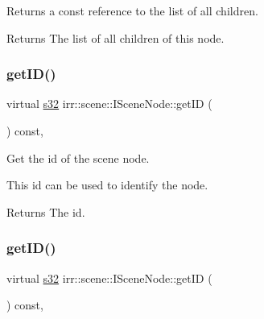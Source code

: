 Returns a const reference to the list of all children. 

\begin{DoxyReturn}{Returns}
The list of all children of this node. 
\end{DoxyReturn}
\mbox{\label{classirr_1_1scene_1_1ISceneNode_a1a3b5b32f54bc1b6617756fc48a2cb17}} 
\subsubsection{\texorpdfstring{get\+I\+D()}{getID()}\hspace{0.1cm}{\footnotesize\ttfamily [1/2]}}
{\footnotesize\ttfamily virtual \hyperlink{namespaceirr_ac66849b7a6ed16e30ebede579f9b47c6}{s32} irr\+::scene\+::\+I\+Scene\+Node\+::get\+ID (\begin{DoxyParamCaption}{ }\end{DoxyParamCaption}) const\hspace{0.3cm}{\ttfamily [inline]}, {\ttfamily [virtual]}}



Get the id of the scene node. 

This id can be used to identify the node. \begin{DoxyReturn}{Returns}
The id. 
\end{DoxyReturn}
\mbox{\label{classirr_1_1scene_1_1ISceneNode_a1a3b5b32f54bc1b6617756fc48a2cb17}} 
\subsubsection{\texorpdfstring{get\+I\+D()}{getID()}\hspace{0.1cm}{\footnotesize\ttfamily [2/2]}}
{\footnotesize\ttfamily virtual \hyperlink{namespaceirr_ac66849b7a6ed16e30ebede579f9b47c6}{s32} irr\+::scene\+::\+I\+Scene\+Node\+::get\+ID (\begin{DoxyParamCaption}{ }\end{DoxyParamCaption}) const\hspace{0.3cm}{\ttfamily [inline]}, {\ttfamily [virtual]}}



